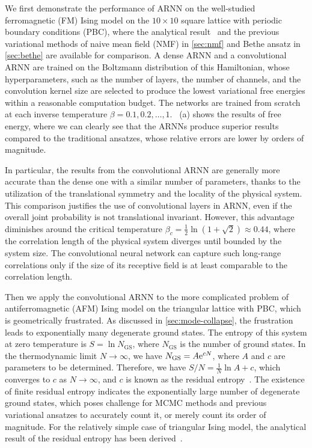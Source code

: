 We first demonstrate the performance of ARNN on the well-studied ferromagnetic (FM) Ising model on the $10 \times 10$ square lattice with periodic boundary conditions (PBC), where the analytical result~\cite{onsager1944crystal} and the previous variational methods of naive mean field (NMF) in \cref{sec:nmf} and Bethe ansatz in \cref{sec:bethe} are available for comparison. A dense ARNN and a convolutional ARNN are trained on the Boltzmann distribution of this Hamiltonian, whose hyperparameters, such as the number of layers, the number of channels, and the convolution kernel size are selected to produce the lowest variational free energies within a reasonable computation budget. The networks are trained from scratch at each inverse temperature $\beta = 0.1, 0.2, \ldots, 1$. ~(a) shows the results of free energy, where we can clearly see that the ARNNs produce superior results compared to the traditional ansatzes, whose relative errors are lower by orders of magnitude.

In particular, the results from the convolutional ARNN are generally more accurate than the dense one with a similar number of parameters, thanks to the utilization of the translational symmetry and the locality of the physical system. This comparison justifies the use of convolutional layers in ARNN, even if the overall joint probability is not translational invariant. However, this advantage diminishes around the critical temperature $\beta_c = \frac{1}{2} \ln(1 + \sqrt{2}) \approx 0.44$, where the correlation length of the physical system diverges until bounded by the system size. The convolutional neural network can capture such long-range correlations only if the size of its receptive field is at least comparable to the correlation length.

Then we apply the convolutional ARNN to the more complicated problem of antiferromagnetic (AFM) Ising model on the triangular lattice with PBC, which is geometrically frustrated. As discussed in \cref{sec:mode-collapse}, the frustration leads to exponentially many degenerate ground states. The entropy of this system at zero temperature is $S = \ln N_\text{GS}$, where $N_\text{GS}$ is the number of ground states. In the thermodynamic limit $N \to \infty$, we have $N_\text{GS} = A \mathrm{e}^{c N}$, where $A$ and $c$ are parameters to be determined. Therefore, we have $S / N = \frac{1}{N} \ln A + c$, which converges to $c$ as $N \to \infty$, and $c$ is known as the residual entropy~\cite{wannier1950antiferromagnetism, mambrini1999residual, vanderstraeten2018residual}. The existence of finite residual entropy indicates the exponentially large number of degenerate ground states, which poses challenge for MCMC methods and previous variational ansatzes to accurately count it, or merely count its order of magnitude. For the relatively simple case of triangular Ising model, the analytical result of the residual entropy has been derived~\cite{wannier1950antiferromagnetism, wannier1973antiferromagnetism}.

